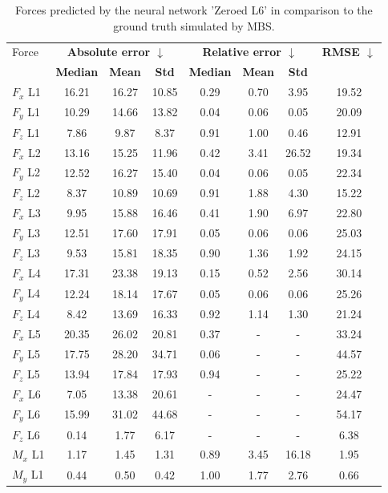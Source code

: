 \begin{table}[h]
\centering
\caption{Forces predicted by the neural network 'Zeroed L6' in comparison to the ground truth simulated by MBS.}
\label{tab:prelim:zeroed_l6.tex}
\begin{tabular}{lccccccc}
\toprule
Force & \multicolumn{3}{c}{\bfseries Absolute error $\downarrow$} & \multicolumn{3}{c}{\bfseries Relative error $\downarrow$} & \bfseries RMSE $\downarrow$ \\
  & \bfseries Median & \bfseries Mean & \bfseries Std & \bfseries Median & \bfseries Mean & \bfseries Std & \bfseries   \\
\midrule
$F_x$ L1 & 16.21 & 16.27 & 10.85 & 0.29 & 0.70 & 3.95 & 19.52 \\
$F_y$ L1 & 10.29 & 14.66 & 13.82 & 0.04 & 0.06 & 0.05 & 20.09 \\
$F_z$ L1 & 7.86 & 9.87 & 8.37 & 0.91 & 1.00 & 0.46 & 12.91 \\
$F_x$ L2 & 13.16 & 15.25 & 11.96 & 0.42 & 3.41 & 26.52 & 19.34 \\
$F_y$ L2 & 12.52 & 16.27 & 15.40 & 0.04 & 0.06 & 0.05 & 22.34 \\
$F_z$ L2 & 8.37 & 10.89 & 10.69 & 0.91 & 1.88 & 4.30 & 15.22 \\
$F_x$ L3 & 9.95 & 15.88 & 16.46 & 0.41 & 1.90 & 6.97 & 22.80 \\
$F_y$ L3 & 12.51 & 17.60 & 17.91 & 0.05 & 0.06 & 0.06 & 25.03 \\
$F_z$ L3 & 9.53 & 15.81 & 18.35 & 0.90 & 1.36 & 1.92 & 24.15 \\
$F_x$ L4 & 17.31 & 23.38 & 19.13 & 0.15 & 0.52 & 2.56 & 30.14 \\
$F_y$ L4 & 12.24 & 18.14 & 17.67 & 0.05 & 0.06 & 0.06 & 25.26 \\
$F_z$ L4 & 8.42 & 13.69 & 16.33 & 0.92 & 1.14 & 1.30 & 21.24 \\
$F_x$ L5 & 20.35 & 26.02 & 20.81 & 0.37 & - & - & 33.24 \\
$F_y$ L5 & 17.75 & 28.20 & 34.71 & 0.06 & - & - & 44.57 \\
$F_z$ L5 & 13.94 & 17.84 & 17.93 & 0.94 & - & - & 25.22 \\
$F_x$ L6 & 7.05 & 13.38 & 20.61 & - & - & - & 24.47 \\
$F_y$ L6 & 15.99 & 31.02 & 44.68 & - & - & - & 54.17 \\
$F_z$ L6 & 0.14 & 1.77 & 6.17 & - & - & - & 6.38 \\
$M_x$ L1 & 1.17 & 1.45 & 1.31 & 0.89 & 3.45 & 16.18 & 1.95 \\
$M_y$ L1 & 0.44 & 0.50 & 0.42 & 1.00 & 1.77 & 2.76 & 0.66 \\

\end{tabular}
\end{table}
